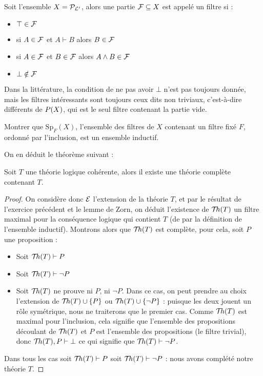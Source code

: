 \begin{defi}[Filtre]
    Soit l'ensemble $X = \mathcal P_{\mathcal L'}$, alors une partie $\mathcal F\subseteq X$ est appelé un filtre si :
    \begin{itemize}[label=$\bullet$]
        \item $\top \in \mathcal F$
        \item si $A\in \mathcal F$ et $A\vdash B$ alors $B\in\mathcal F$
        \item si $A\in \mathcal F$ et $B\in\mathcal F$ alors $A\land B \in \mathcal F$
        \item $\bot\notin \mathcal F$
    \end{itemize}
\end{defi}

\begin{rmk}
    Dans la littérature, la condition de ne pas avoir $\bot$ n'est pas toujours donnée, mais les filtres intéressants sont toujours ceux dits non triviaux, c'est-à-dire différents de $\mathcal \mathcal P(X)$, qui est le seul \og filtre\fg{} contenant la partie vide.
\end{rmk}

\begin{exo}
    Montrer que $\mathrm{Sp}_F(X)$, l'ensemble des filtres de $X$ contenant un filtre fixé $F$, ordonné par l'inclusion, est un ensemble inductif.
\end{exo}

On en déduit le théorème suivant :

\begin{them}
    Soit $T$ une théorie logique cohérente, alors il existe une théorie complète contenant $T$.
\end{them}

\begin{proof}
    On considère donc $\mathcal E$ l'extension de la théorie $T$, et par le résultat de l'exercice précédent et le lemme de Zorn, on déduit l'existence de $\mathcal{T}\!h(T)$ un filtre maximal pour la conséquence logique qui contient $T$ (de par la définition de l'ensemble inductif). Montrons alors que $\mathcal{T}\!h(T)$ est complète, pour cela, soit $P$ une proposition :
    \begin{itemize}[label=$\bullet$]
        \item Soit $\mathcal{T}\!h(T)\vdash P$
        \item Soit $\mathcal{T}\!h(T)\vdash \lnot P$
        \item Soit $\mathcal{T}\!h(T)$ ne prouve ni $P$, ni $\lnot P$. Dans ce cas, on peut prendre au choix l'extension de $\mathcal{T}\!h(T)\cup\{P\}$ ou $\mathcal{T}\!h(T)\cup\{\lnot P\}$ : puisque les deux jouent un rôle symétrique, nous ne traiterons que le premier cas. Comme $\mathcal{T}\!h(T)$ est maximal pour l'inclusion, cela signifie que l'ensemble des propositions découlant de $\mathcal{T}\!h(T)$ et $P$ est l'ensemble des propositions (le filtre trivial), donc $\mathcal{T}\!h(T),P\vdash \bot$ ce qui signifie que $\mathcal{T}\!h(T)\vdash \lnot P$.
    \end{itemize}
    Dans tous les cas soit $\mathcal{T}\!h(T)\vdash P$ soit $\mathcal{T}\!h(T)\vdash \lnot P$ : nous avons complété notre théorie $T$.
\end{proof}

